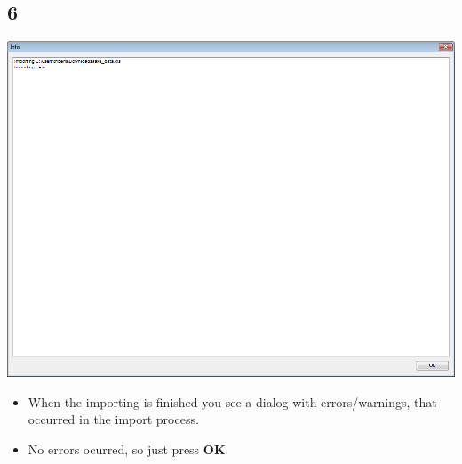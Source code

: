 \documentclass{beamer}
\begin{document}
\subsection{6}
\begin{frame}
	\begin{center}
  		\includegraphics[height=0.6\textheight]{6.png}
	\end{center}
	\begin{itemize}
		\item When the importing is finished you see a dialog with errors/warnings,  that occurred in the import process.
		\item No errors ocurred, so just press \textbf{OK}.
	\end{itemize}
\end{frame}
\end{document}
